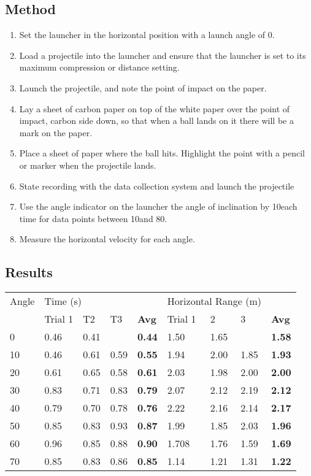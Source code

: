 	\subsection{Method}
		\begin{enumerate}
			\item Set the launcher in the horizontal position with a launch angle of 0\textdegree.
			\item Load a projectile into the launcher and ensure that the launcher is set to its maximum compression or distance setting.
			\item Launch the projectile, and note the point of impact on the paper.
			\item Lay a sheet of carbon paper on top of the white paper over the point of impact, carbon side down, so that when a ball lands on it there will be a mark on the paper.
			\item Place a sheet of paper where the ball hits. Highlight the point with a pencil or marker when the projectile lands.
			\item State recording with the data collection system and launch the projectile
			\item Use the angle indicator on the launcher the angle of inclination by 10\textdegree each time for data points between 10\textdegree and 80\textdegree.
			\item Measure the horizontal velocity for each angle.
		\end{enumerate}

	\subsection{Results}
		\begin{table}[H]
			\centering
			  \begin{tabular}{lllllllll}
			  Angle \textdegree & \multicolumn{4}{l}{Time (s)}      & \multicolumn{3}{l}{Horizontal Range (m)} &  \\
					& Trial 1 & T2    & T3    & \textbf{Avg} & Trial 1 & 2     & 3     & \textbf{Avg} \\
			  0     & 0.46  & 0.41  &       & \textbf{0.44} & 1.50  & 1.65  &       & \textbf{1.58} \\
			  10    & 0.46  & 0.61  & 0.59  & \textbf{0.55} & 1.94  & 2.00  & 1.85  & \textbf{1.93} \\
			  20    & 0.61  & 0.65  & 0.58  & \textbf{0.61} & 2.03  & 1.98  & 2.00  & \textbf{2.00} \\
			  30    & 0.83  & 0.71  & 0.83  & \textbf{0.79} & 2.07  & 2.12  & 2.19  & \textbf{2.12} \\
			  40    & 0.79  & 0.70  & 0.78  & \textbf{0.76} & 2.22  & 2.16  & 2.14  & \textbf{2.17} \\
			  50    & 0.85  & 0.83  & 0.93  & \textbf{0.87} & 1.99  & 1.85  & 2.03  & \textbf{1.96} \\
			  60    & 0.96  & 0.85  & 0.88  & \textbf{0.90} & 1.708 & 1.76  & 1.59  & \textbf{1.69} \\
			  70    & 0.85  & 0.83  & 0.86  & \textbf{0.85} & 1.14  & 1.21  & 1.31  & \textbf{1.22} \\
			  \end{tabular}
		\end{table}

